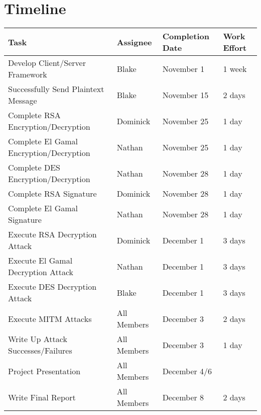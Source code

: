 \documentclass[12pt]{report}
\begin{document}
\section{Timeline}
\begin{tabular}{l|l|l|l}
    Task & Assignee & Completion Date & Work Effort\\ \hline
    Develop Client/Server Framework & Blake & November 1 & 1 week\\
    Successfully Send Plaintext Message & Blake & November 15 & 2 days\\
    Complete RSA Encryption/Decryption & Dominick & November 25 & 1 day\\
    Complete El Gamal Encryption/Decryption & Nathan & November 25 & 1 day\\
    Complete DES Encryption/Decryption & Nathan & November 28 & 1 day\\
    Complete RSA Signature & Dominick & November 28 & 1 day\\
    Complete El Gamal Signature & Nathan & November 28 & 1 day\\
    Execute RSA Decryption Attack & Dominick & December 1 & 3 days\\
    Execute El Gamal Decryption Attack & Nathan & December 1 & 3 days\\
    Execute DES Decryption Attack & Blake & December 1 & 3 days\\
    Execute MITM Attacks & All Members & December 3 & 2 days\\
    Write Up Attack Successes/Failures & All Members & December 3 & 1 day\\
    Project Presentation & All Members & December 4/6\\ 
    Write Final Report & All Members & December 8 & 2 days
\end{tabular}

\end{document}
